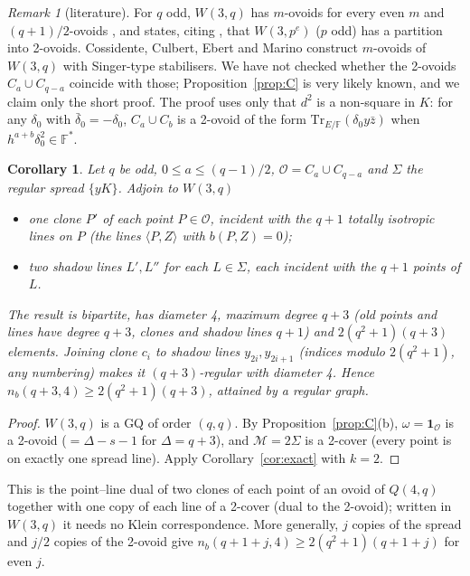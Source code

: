 \documentclass[11pt]{amsart}
\newtheorem{corollary}[theorem]{Corollary}
\theoremstyle{definition}
\theoremstyle{remark}
\newtheorem{remark}[theorem]{Remark}
\numberwithin{equation}{section}
\newcommand{\F}{\mathbb F}
\newcommand{\Tr}{\mathrm{Tr}}
\newcommand{\nb}{n_b}
\newcommand{\cM}{\mathcal M}
\newcommand{\cO}{\mathcal O}
\begin{document}
\begin{remark}[literature]
For $q$ odd, $W(3,q)$ has $m$-ovoids for every even $m$ and $(q+1)/2$-ovoids \cite{BLP09}, and \cite{FWX19} states,
citing \cite{BLP09}, that $W(3,p^e)$ ($p$ odd) has a partition into 2-ovoids. Cossidente, Culbert, Ebert and Marino
\cite{CCEM08} construct $m$-ovoids of $W(3,q)$ with Singer-type stabilisers. We have not checked whether the 2-ovoids
$C_a\cup C_{q-a}$ coincide with those; Proposition~\ref{prop:C} is very likely known, and we claim only the short proof.
The proof uses only that $d^2$ is a non-square in $K$: for any $\delta_0$ with $\bar\delta_0=-\delta_0$, $C_a\cup C_b$ is a
2-ovoid of the form $\Tr_{E/\F}(\delta_0y\bar z)$ when $h^{a+b}\delta_0^2\in\F^*$.
\end{remark}

\begin{corollary}\label{cor:C1}
Let $q$ be odd, $0\le a\le(q-1)/2$, $\cO=C_a\cup C_{q-a}$ and $\Sigma$ the regular spread $\{yK\}$. Adjoin to $W(3,q)$
\begin{itemize}
\item one clone $P'$ of each point $P\in\cO$, incident with the $q+1$ totally isotropic lines on $P$ (the lines $\langle
  P,Z\rangle$ with $b(P,Z)=0$);
\item two shadow lines $L',L''$ for each $L\in\Sigma$, each incident with the $q+1$ points of $L$.
\end{itemize}
The result is bipartite, has diameter 4, maximum degree $q+3$ (old points and lines have degree $q+3$, clones and shadow
lines $q+1$) and $2(q^2+1)(q+3)$ elements. Joining clone $c_i$ to shadow lines $y_{2i},y_{2i+1}$ (indices modulo
$2(q^2+1)$, any numbering) makes it $(q+3)$-regular with diameter 4. Hence $\nb(q+3,4)\ge2(q^2+1)(q+3)$, attained by a
regular graph.
\end{corollary}

\begin{proof}
$W(3,q)$ is a GQ of order $(q,q)$. By Proposition~\ref{prop:C}(b), $\omega=\mathbf 1_\cO$ is a 2-ovoid ($=\Delta-s-1$ for
$\Delta=q+3$), and $\cM=2\Sigma$ is a 2-cover (every point is on exactly one spread line). Apply
Corollary~\ref{cor:exact} with $k=2$.
\end{proof}

This is the point--line dual of two clones of each point of an ovoid of $Q(4,q)$ together with one copy of each line of
a 2-cover (dual to the 2-ovoid); written in $W(3,q)$ it needs no Klein correspondence. More generally, $j$ copies of the spread and $j/2$ copies of the 2-ovoid give
$\nb(q+1+j,4)\ge2(q^2+1)(q+1+j)$ for even $j$.
\end{document}

